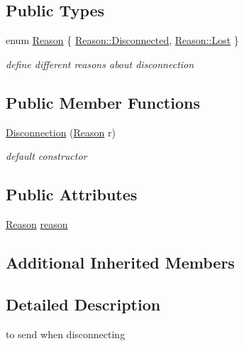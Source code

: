 \subsection*{Public Types}
\begin{DoxyCompactItemize}
\item 
enum \hyperlink{class_network_1_1_messages_1_1_disconnection_a0c473c9cdef42320c45dbc239f1c5c21}{Reason} \{ \hyperlink{class_network_1_1_messages_1_1_disconnection_a0c473c9cdef42320c45dbc239f1c5c21aef70e46fd3bbc21e3e1f0b6815e750c0}{Reason\+::\+Disconnected}, 
\hyperlink{class_network_1_1_messages_1_1_disconnection_a0c473c9cdef42320c45dbc239f1c5c21ab578b733cbb788fc6ad208314d2c4c2b}{Reason\+::\+Lost}
 \}\begin{DoxyCompactList}\small\item\em define different reasons about disconnection \end{DoxyCompactList}
\end{DoxyCompactItemize}
\subsection*{Public Member Functions}
\begin{DoxyCompactItemize}
\item 
\hyperlink{class_network_1_1_messages_1_1_disconnection_a36af05a34ca6caf93bc68f2562a08166}{Disconnection} (\hyperlink{class_network_1_1_messages_1_1_disconnection_a0c473c9cdef42320c45dbc239f1c5c21}{Reason} r)
\begin{DoxyCompactList}\small\item\em default constructor \end{DoxyCompactList}\end{DoxyCompactItemize}
\subsection*{Public Attributes}
\begin{DoxyCompactItemize}
\item 
\hyperlink{class_network_1_1_messages_1_1_disconnection_a0c473c9cdef42320c45dbc239f1c5c21}{Reason} \hyperlink{class_network_1_1_messages_1_1_disconnection_a48eb1be4be59d3e75de7bf203f092899}{reason}
\end{DoxyCompactItemize}
\subsection*{Additional Inherited Members}


\subsection{Detailed Description}
to send when disconnecting 

